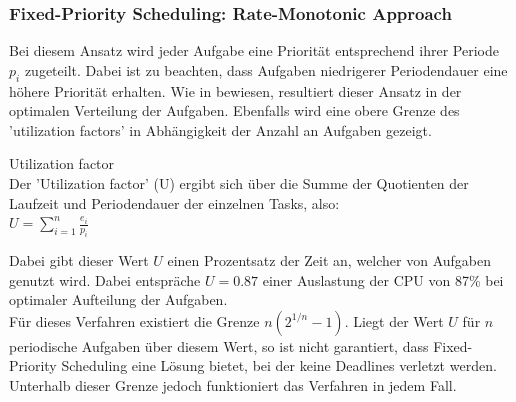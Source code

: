 \subsubsection{Fixed-Priority Scheduling: Rate-Monotonic Approach}
\label{2.7.4}
Bei diesem Ansatz wird jeder Aufgabe eine Priorität entsprechend ihrer Periode $p_i$ zugeteilt. Dabei ist zu beachten, dass Aufgaben niedrigerer Periodendauer eine höhere Priorität erhalten. Wie in \cite[p. 102f]{RTS} bewiesen, resultiert dieser Ansatz in der optimalen Verteilung der Aufgaben. Ebenfalls wird eine obere Grenze des 'utilization factors' in Abhängigkeit der Anzahl an Aufgaben gezeigt.\\
\begin{definition}{Utilization factor}\\
Der 'Utilization factor' (U) ergibt sich über die Summe der Quotienten der Laufzeit und Periodendauer der einzelnen Tasks, also:\\
$U = \sum\limits_{i=1}^n \frac{e_i}{p_i}$\\
\end{definition}
Dabei gibt dieser Wert $U$ einen Prozentsatz der Zeit an, welcher von Aufgaben genutzt wird. Dabei entspräche $U=0.87$ einer Auslastung der CPU von 87\% bei optimaler Aufteilung der Aufgaben.\\
Für dieses Verfahren existiert die Grenze $n(2^{1/n} - 1)$. Liegt der Wert $U$ für $n$ periodische Aufgaben über diesem Wert, so ist nicht garantiert, dass Fixed-Priority Scheduling eine Lösung bietet, bei der keine Deadlines verletzt werden. Unterhalb dieser Grenze jedoch funktioniert das Verfahren in jedem Fall.

